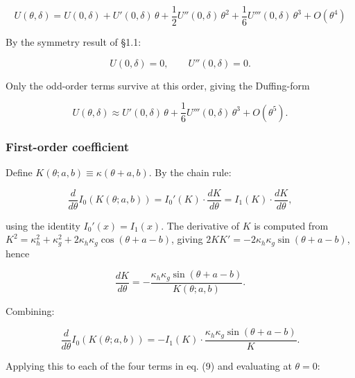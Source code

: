 \documentclass[11pt]{article}
\begin{document}
\begin{equation}
U(\theta, \delta) = U(0, \delta) + U'(0, \delta)\,\theta + \frac{1}{2} U''(0, \delta)\,\theta^2 + \frac{1}{6} U'''(0, \delta)\,\theta^3 + O(\theta^4)
\end{equation}

By the symmetry result of §1.1:

\begin{equation}
U(0, \delta) = 0, \qquad U''(0, \delta) = 0.
\end{equation}

Only the odd-order terms survive at this order, giving the Duffing-form

\begin{equation*}
U(\theta, \delta) \approx U'(0, \delta)\,\theta + \frac{1}{6} U'''(0, \delta)\,\theta^3 + O(\theta^5).
\end{equation*}

\subsubsection{First-order coefficient}

Define $K(\theta; a, b) \equiv \kappa(\theta + a, b)$. By the chain rule:

\begin{equation}
\frac{d}{d\theta} I_0(K(\theta; a, b)) = I_0'(K) \cdot \frac{dK}{d\theta} = I_1(K) \cdot \frac{dK}{d\theta}, \tag{13a}
\end{equation}

using the identity $I_0'(x) = I_1(x)$. The derivative of $K$ is computed from $K^2 = \kappa_h^2 + \kappa_g^2 + 2\kappa_h\kappa_g\cos(\theta + a - b)$, giving $2K K' = -2\kappa_h\kappa_g\sin(\theta + a - b)$, hence

\begin{equation}
\frac{dK}{d\theta} = -\frac{\kappa_h\kappa_g \sin(\theta + a - b)}{K(\theta; a, b)}. \tag{13b}
\end{equation}

Combining:

\begin{equation}
\frac{d}{d\theta} I_0(K(\theta; a, b)) = -I_1(K) \cdot \frac{\kappa_h\kappa_g \sin(\theta + a - b)}{K}. \tag{13c}
\end{equation}

Applying this to each of the four terms in eq. (9) and evaluating at $\theta = 0$:
\end{document}
